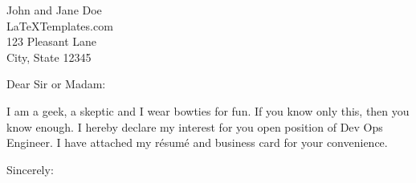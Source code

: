 \documentclass[
    jphafner,
    fontsize=11pt,
    foldmarks=true,
    pagenumber=false,
    addrfield=false,
]{scrlttr2}
\date{\today}
\begin{document}
\begin{letter}{John and Jane Doe \\ LaTeXTemplates.com \\ 123 Pleasant Lane \\ City, State 12345} %
\opening{Dear Sir or Madam:}

I am a geek, a skeptic and I wear bowties for fun.
If you know only this, then you know enough.
I hereby declare my interest for you open position of Dev Ops Engineer.
I have attached my r\'{e}sum\'{e} and business card for your convenience.

\closing{Sincerely:}
\end{letter}
\end{document}
